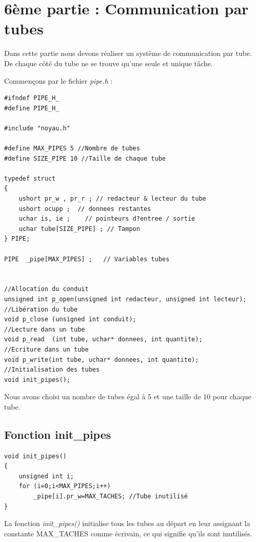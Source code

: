 \documentclass[a4paper,12pt]{report}
\begin{document}
\section{6ème partie : Communication par tubes}
Dans cette partie nous devons réaliser un système de communication par tube. De chaque côté du tube ne se trouve qu'une seule et unique tâche.

Commençons par le fichier \textit{pipe.h} :
\begin{lstlisting}
#ifndef PIPE_H_
#define PIPE_H_

#include "noyau.h"

#define MAX_PIPES 5 //Nombre de tubes
#define SIZE_PIPE 10 //Taille de chaque tube

typedef struct
{
	ushort pr_w , pr_r ; // redacteur & lecteur du tube  
	ushort ocupp ;  // donnees restantes  
	uchar is, ie ;    // pointeurs d?entree / sortie  
	uchar tube[SIZE_PIPE] ; // Tampon  
} PIPE;

PIPE  _pipe[MAX_PIPES] ;   // Variables tubes  


//Allocation du conduit
unsigned int p_open(unsigned int redacteur, unsigned int lecteur); 
//Libération du tube
void p_close (unsigned int conduit); 
//Lecture dans un tube
void p_read  (int tube, uchar* donnees, int quantite); 
//Ecriture dans un tube
void p_write(int tube, uchar* donnees, int quantite); 
//Initialisation des tubes
void init_pipes();
\end{lstlisting}

Nous avons choisi un nombre de tubes égal à 5 et une taille de 10 pour chaque tube.

\subsection{Fonction init\_pipes}
\begin{lstlisting}
void init_pipes()
{
	unsigned int i;
	for (i=0;i<MAX_PIPES;i++)
		_pipe[i].pr_w=MAX_TACHES; //Tube inutilisé
}
\end{lstlisting}
La fonction \textit{init\_pipes()} initialise tous les tubes au départ en leur assignant la constante MAX\_TACHES comme écrivain, ce qui signifie qu'ils sont inutilisés.
\end{document}
